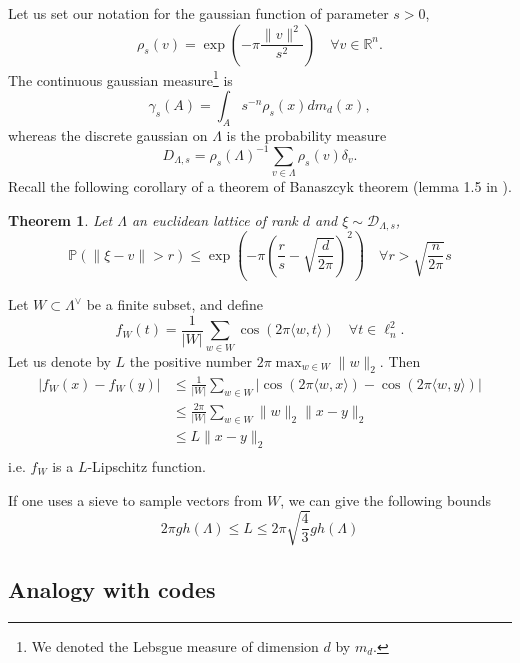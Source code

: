 \documentclass{article}
\newtheorem{theorem}{Theorem}
\begin{document}
Let us set our notation for the gaussian function of parameter $s>0$, 
$$\rho_s(v)=\exp(-\pi\frac{\|v\|^2 }{s^2} )\quad \forall v\in \mathbb R^n.$$
The continuous gaussian measure\footnote{We denoted the Lebsgue measure of dimension $d$ by $m_d$.} is 
$$\gamma_s(A) =  \int_A s^{-n}\rho_s(x)dm_d(x) ,$$
whereas the discrete gaussian on $\Lambda$ is the probability measure 
$$D_{\Lambda , s} = \rho_s(\Lambda )^{-1} \sum_{v\in \Lambda} \rho_s(v)\delta_v. $$
Recall the following corollary of a theorem of Banaszcyk theorem (lemma 1.5 in \cite{banaszczyk1993new}).

\begin{theorem}
Let $\Lambda$ an euclidean lattice of rank $d$ and $\xi \sim \mathcal D_{\Lambda , s}$,
$$\mathbb P(\|\xi - v\|> r ) \leq \exp(-\pi (\frac{r}{s} -\sqrt{\frac{d}{2\pi}})^2) \quad \forall r >\sqrt{\frac{n}{2\pi}}s $$
\end{theorem}

Let $W\subset \Lambda^\vee$ be a finite subset, and define 
$$f_W(t) = \frac{1}{|W|}\sum_{w\in W} \cos(2\pi \langle w , t \rangle) \quad \forall t \in \ell^2_n.$$
Let us denote by $L$ the positive number $2\pi\max_{w\in W} \|w\|_2$. Then
\[\begin{split}
|f_W(x) -f_W(y)| & \leq \frac{1}{|W|}\sum_{w\in W} |\cos(2\pi \langle w , x \rangle ) -\cos(2\pi \langle w , y \rangle) | \\
		 & \leq \frac{2\pi}{|W|}\sum_{w\in W} \|w\|_2 \|x-y\|_2\\
		 & \leq L\|x-y\|_2\\ 
\end{split}\]
i.e. $f_W$ is a $L$-Lipschitz function.  

If one uses a sieve to sample vectors from $W$, we can give the following bounds 
$$2\pi gh(\Lambda) \leq L \leq 2\pi\sqrt{\frac{4}{3}}gh(\Lambda) $$

\subsection{Analogy with codes}
\end{document}
